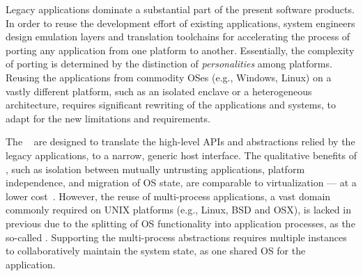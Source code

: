 Legacy applications dominate a substantial part of the present software products.
In order to reuse the development effort
of existing applications,
system engineers design emulation layers and translation toolchains
for accelerating the process of
porting any application from one platform to another.
Essentially, the complexity of porting is determined
by the distinction of \emph{personalities} among platforms.
Reusing the applications from commodity OSes (e.g., Windows, Linux)
on a vastly different platform,
such as an isolated enclave
or a heterogeneous architecture,
requires significant rewriting of the applications and systems,
to adapt for the new limitations and requirements.

The \term{\liboses{}}~\citep{porter11drawbridge, baumann13bascule, unikernels}
are designed to translate the high-level APIs
and abstractions
relied by the legacy applications,
to a narrow, generic host interface.
The qualitative benefits of \liboses{},
such as isolation between mutually untrusting applications,
platform independence,
and migration of OS state,
are comparable to virtualization
--- at a lower cost~\citep{porter11drawbridge}.
However, the reuse of multi-process applications, a vast domain
commonly required on UNIX platforms (e.g., Linux, BSD and OSX),
is lacked in previous \liboses{} due to
the splitting of OS functionality into application processes,
as the so-called \term{\picoprocs{}}.
Supporting the multi-process abstractions
requires multiple \libos{} instances to collaboratively maintain the system state,
as one shared OS for the application.







